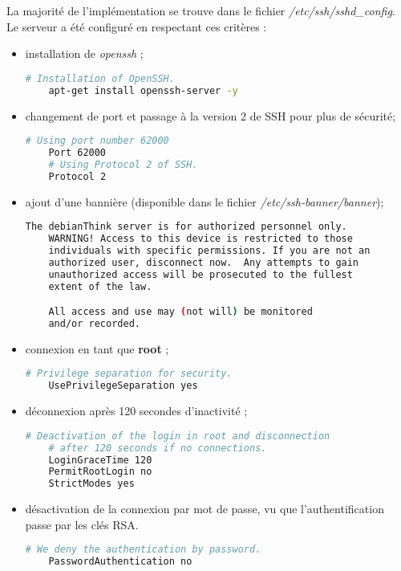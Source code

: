 La majorité de l'implémentation se trouve dans le fichier
\textit{/etc/ssh/sshd\_config}. \\
Le serveur a été configuré en respectant ces critères :
\begin{itemize}
\item installation de \textit{openssh} ;

  \begin{lstlisting}[language=bash]
    # Installation of OpenSSH.
    apt-get install openssh-server -y
  \end{lstlisting}

\item changement de port et passage à la version 2 de SSH pour plus de sécurité;

  \begin{lstlisting}[language=bash]
    # Using port number 62000
    Port 62000
    # Using Protocol 2 of SSH.
    Protocol 2
  \end{lstlisting}

  \newpage

\item ajout d'une bannière (disponible dans le fichier \textit{/etc/ssh-banner/banner});

  \begin{lstlisting}[language=bash]
    The debianThink server is for authorized personnel only.
    WARNING! Access to this device is restricted to those
    individuals with specific permissions. If you are not an
    authorized user, disconnect now.  Any attempts to gain
    unauthorized access will be prosecuted to the fullest
    extent of the law.

    All access and use may (not will) be monitored
    and/or recorded.
  \end{lstlisting}

\item connexion en tant que \textbf{root} ;

  \begin{lstlisting}[language=bash]
    # Privilege separation for security.
    UsePrivilegeSeparation yes
  \end{lstlisting}

\item déconnexion après 120 secondes d'inactivité ;

  \begin{lstlisting}[language=bash]
    # Deactivation of the login in root and disconnection
    # after 120 seconds if no connections.
    LoginGraceTime 120
    PermitRootLogin no
    StrictModes yes
  \end{lstlisting}

\item désactivation de la connexion par mot de passe, vu que l'authentification
  passe par les clés RSA.

  \begin{lstlisting}[language=bash]
    # We deny the authentication by password.
    PasswordAuthentication no
  \end{lstlisting}
\end{itemize}

